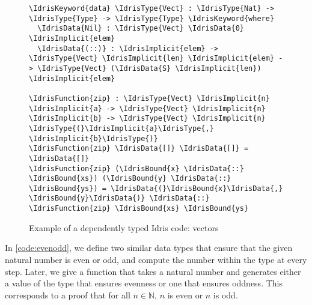 \begin{figure}[ht]
\caption{Example of a dependently typed Idris code: vectors}
\label{code:vect}
\begin{Verbatim}[framesep=2mm, label=\footnotesize{\normalfont{Idris}}, labelposition=topline]
\IdrisKeyword{data} \IdrisType{Vect} : \IdrisType{Nat} -> \IdrisType{Type} -> \IdrisType{Type} \IdrisKeyword{where}
  \IdrisData{Nil} : \IdrisType{Vect} \IdrisData{0} \IdrisImplicit{elem}
  \IdrisData{(::)} : \IdrisImplicit{elem} -> \IdrisType{Vect} \IdrisImplicit{len} \IdrisImplicit{elem} -> \IdrisType{Vect} (\IdrisData{S} \IdrisImplicit{len}) \IdrisImplicit{elem}

\IdrisFunction{zip} : \IdrisType{Vect} \IdrisImplicit{n} \IdrisImplicit{a} -> \IdrisType{Vect} \IdrisImplicit{n} \IdrisImplicit{b} -> \IdrisType{Vect} \IdrisImplicit{n} \IdrisType{(}\IdrisImplicit{a}\IdrisType{,} \IdrisImplicit{b}\IdrisType{)}
\IdrisFunction{zip} \IdrisData{[]} \IdrisData{[]} = \IdrisData{[]}
\IdrisFunction{zip} (\IdrisBound{x} \IdrisData{::} \IdrisBound{xs}) (\IdrisBound{y} \IdrisData{::} \IdrisBound{ys}) = \IdrisData{(}\IdrisBound{x}\IdrisData{,} \IdrisBound{y}\IdrisData{)} \IdrisData{::} \IdrisFunction{zip} \IdrisBound{xs} \IdrisBound{ys}
\end{Verbatim}
\end{figure}

In \autoref{code:evenodd}, we define
two similar data types that ensure that the given natural number is even or
odd, and compute the number within the type at every step. Later, we give a
function that takes a natural number and generates either a value of the type
that ensures evenness or one that ensures oddness. This corresponds to a proof that for all $n \in \mathbb{N}$, $n$ is even or $n$ is odd.

